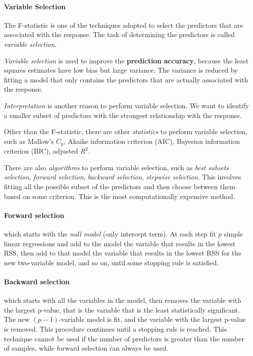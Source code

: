\paragraph*{Variable Selection}
The F-statistic is one of the techniques adopted to select the predictors that are associated with the response. The task of determining the predictors is called \textit{variable selection}.

\textit{Variable selection} is used to improve the \textbf{prediction accuracy}, because the least squares estimates have low bias but large variance. The variance is reduced by fitting a model that only contains the predictors that are actually associated with the response.

\textit{Interpretation} is another reason to perform variable selection. We want to identify a smaller subset of predictors with the strongest relationship with the response.

Other than the F-statistic, there are other \textit{statistics} to perform variable selection, such as Mallow's $C_p$, Akaike information criterion (AIC), Bayesian information criterion (BIC), adjusted $R^2$.

There are also \textit{algorithms} to perform variable selection, such as \textit{best subsets selection}, \textit{forward selection}, \textit{backward selection}, \textit{stepwise selection}. This involves fitting all the possible subset of the predictors and then choose between them based on some criterion. This is the most computationally expensive method.

\paragraph*{Forward selection} which starts with the \textit{null model} (only intercept term). At each step fit $p$ simple linear regressions and add to the model the variable that results in the lowest RSS, then add to that model the variable that results in the lowest RSS for the new two-variable model, and so on, until some stopping rule is satisfied.

\paragraph*{Backward selection} which starts with all the variables in the model, then removes the variable with the largest p-value, that is the variable that is the least statistically significant. The new $(p-1)$-variable model is fit, and the variable with the largest p-value is removed. This procedure continues until a stopping rule is reached. This technique cannot be used if the number of predictors is greater than the number of samples, while forward selection can always be used.

